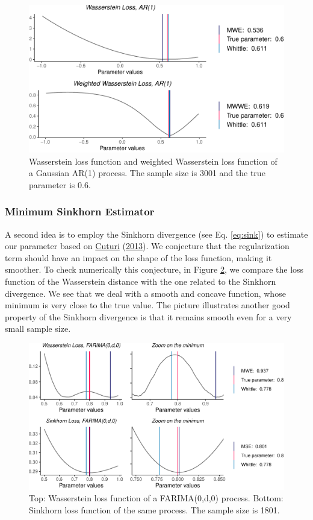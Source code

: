 \documentclass[
  11pt,
]{article}
\begin{document}
\begin{figure}

{\centering \includegraphics[width=0.6\linewidth]{Master_thesis_V4_files/figure-latex/wass_ar1_weighted-1} 

}

\caption{Wasserstein loss function and weighted Wasserstein loss function of a Gaussian AR(1) process. The sample size is 3001 and the true parameter is 0.6.}\label{fig:wass_ar1_weighted}
\end{figure}

\hypertarget{minimum-sinkhorn-estimator}{%
\subsubsection{Minimum Sinkhorn
Estimator}\label{minimum-sinkhorn-estimator}}

A second idea is to employ the Sinkhorn divergence (see Eq.
\ref{eq:sink}) to estimate our parameter based on
\protect\hyperlink{ref-cuturi2013sinkhorn}{Cuturi}
(\protect\hyperlink{ref-cuturi2013sinkhorn}{2013}). We conjecture that
the regularization term should have an impact on the shape of the loss
function, making it smoother. To check numerically this conjecture, in
Figure \ref{fig:sinkhorn}, we compare the loss function of the
Wasserstein distance with the one related to the Sinkhorn divergence. We
see that we deal with a smooth and concave function, whose minimum is
very close to the true value. The picture illustrates another good
property of the Sinkhorn divergence is that it remains smooth even for a
very small sample size.

\begin{figure}

{\centering \includegraphics[width=0.65\linewidth]{Master_thesis_V4_files/figure-latex/sinkhorn-1} 

}

\caption{Top: Wasserstein loss function of a FARIMA(0,d,0) process. Bottom: Sinkhorn loss function of the same process. The sample size is 1801.}\label{fig:sinkhorn}
\end{figure}
\end{document}
